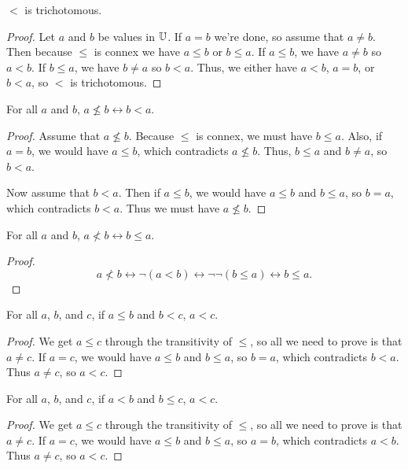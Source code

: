 \documentclass[../math.tex]{subfiles}
\begin{document}
\begin{instance}
    $<$ is trichotomous.
\end{instance}
\begin{proof}
    Let $a$ and $b$ be values in $\mathbb{U}$.  If $a = b$ we're done, so assume that $a
    \neq b$.  Then because $\leq$ is connex we have $a \leq b$ or $b \leq a$.
    If $a \leq b$, we have $a \neq b$ so $a < b$.  If $b \leq a$, we have $b
    \neq a$ so $b < a$.  Thus, we either have $a < b$, $a = b$, or $b < a$, so
    $<$ is trichotomous.
\end{proof}

\begin{theorem}
    For all $a$ and $b$, $a \nleq b \leftrightarrow b < a$.
\end{theorem}
\begin{proof}
    Assume that $a \nleq b$.  Because $\leq$ is connex, we must have $b \leq a$.
    Also, if $a = b$, we would have $a \leq b$, which contradicts $a \nleq b$.
    Thus, $b \leq a$ and $b \neq a$, so $b < a$.

    Now assume that $b < a$.  Then if $a \leq b$, we would have $a \leq b$ and
    $b \leq a$, so $b = a$, which contradicts $b < a$.  Thus we must have $a
    \nleq b$.
\end{proof}

\begin{theorem}
    For all $a$ and $b$, $a \nless b \leftrightarrow b \leq a$.
\end{theorem}
\begin{proof}
    \[
        a \nless b \leftrightarrow \neg (a < b) \leftrightarrow \neg\neg (b \leq
        a) \leftrightarrow b \leq a.
    \]
\end{proof}

\begin{theorem}
    For all $a$, $b$, and $c$, if $a \leq b$ and $b < c$, $a < c$.
\end{theorem}
\begin{proof}
    We get $a \leq c$ through the transitivity of $\leq$, so all we need to
    prove is that $a \neq c$.  If $a = c$, we would have $a \leq b$ and $b \leq
    a$, so $b = a$, which contradicts $b < a$.  Thus $a \neq c$, so $a < c$.
\end{proof}

\begin{theorem}
    For all $a$, $b$, and $c$, if $a < b$ and $b \leq c$, $a < c$.
\end{theorem}
\begin{proof}
    We get $a \leq c$ through the transitivity of $\leq$, so all we need to
    prove is that $a \neq c$.  If $a = c$, we would have $a \leq b$ and $b \leq
    a$, so $a = b$, which contradicts $a < b$.  Thus $a \neq c$, so $a < c$.
\end{proof}
\end{document}
